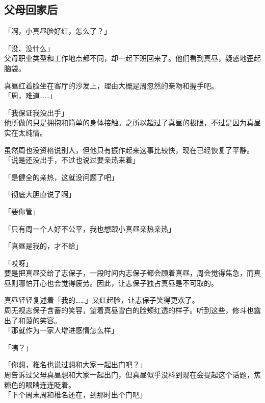 \subsection{父母回家后}

「啊，小真昼脸好红，怎么了？」

「没、没什么」\\

父母职业类型和工作地点都不同，却一起下班回来了。他们看到真昼，疑惑地歪起脑袋。

真昼红着脸坐在客厅的沙发上，理由大概是周忽然的亲吻和握手吧。\\

「周，难道……」

「我保证我没出手」\\

他所做的只是拥抱和简单的身体接触。之所以超过了真昼的极限，不过是因为真昼实在太纯情。

虽然周也没资格说别人，但他只有振作起来这事比较快，现在已经恢复了平静。\\

「说是还没出手，不过也说过要亲热来着」

「是健全的亲热，这就没问题了吧」

「彻底大胆直说了啊」

「要你管」

「只有周一个人好不公平，我也想跟小真昼亲热亲热」

「真昼是我的，才不给」

「哎呀」\\

要是把真昼交给了志保子，一段时间内志保子都会顾着真昼，周会觉得焦急，而真昼则哪怕开心也会觉得疲劳。因此，让志保子独占真昼是不可取的。

真昼轻轻复述着「我的……」又红起脸，让志保子笑得更欢了。\\

周无视志保子含蓄的笑容，望着真昼雪白的脸颊红透的样子。听到这些，修斗也露出了和蔼的笑容。\\

「那就作为一家人增进感情怎么样」

「咦？」

「你想，椎名也说过想和大家一起出门吧？」\\

周告诉过父母真昼想和大家一起出门，但真昼似乎没料到现在会提起这个话题，焦糖色的眼睛连连眨着。\\

「下个周末周和椎名还在，到那时出个门吧」

